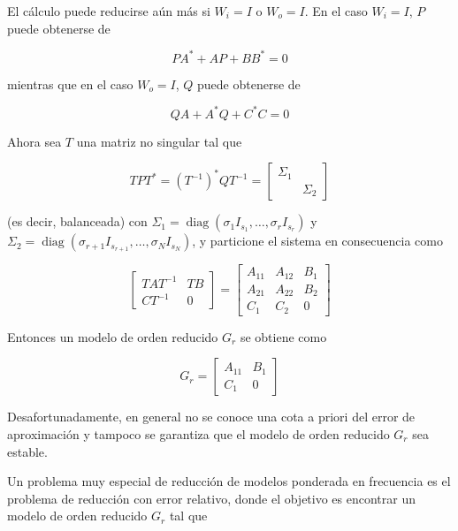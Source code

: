 El cálculo puede reducirse aún más si $W_{i}=I$ o $W_{o}=I$. En el caso $W_{i}=I$, $P$ puede obtenerse de


\begin{equation*}
P A^{*}+A P+B B^{*}=0 \tag{7.21}
\end{equation*}


mientras que en el caso $W_{o}=I$, $Q$ puede obtenerse de


\begin{equation*}
Q A+A^{*} Q+C^{*} C=0 \tag{7.22}
\end{equation*}


Ahora sea $T$ una matriz no singular tal que

$$
T P T^{*}=\left(T^{-1}\right)^{*} Q T^{-1}=\left[\begin{array}{ll}
\Sigma_{1} & \\
& \Sigma_{2}
\end{array}\right]
$$

(es decir, balanceada) con $\Sigma_{1}=\operatorname{diag}\left(\sigma_{1} I_{s_{1}}, \ldots, \sigma_{r} I_{s_{r}}\right)$ y $\Sigma_{2}=\operatorname{diag}\left(\sigma_{r+1} I_{s_{r+1}}, \ldots, \sigma_{N} I_{s_{N}}\right)$, y particione el sistema en consecuencia como

$$
\left[\begin{array}{c|c}
T A T^{-1} & T B \\
\hline C T^{-1} & 0
\end{array}\right]=\left[\begin{array}{cc|c}
A_{11} & A_{12} & B_{1} \\
A_{21} & A_{22} & B_{2} \\
\hline C_{1} & C_{2} & 0
\end{array}\right]
$$

Entonces un modelo de orden reducido $G_{r}$ se obtiene como

$$
G_{r}=\left[\begin{array}{c|c}
A_{11} & B_{1} \\
\hline C_{1} & 0
\end{array}\right]
$$

Desafortunadamente, en general no se conoce una cota a priori del error de aproximación y tampoco se garantiza que el modelo de orden reducido $G_{r}$ sea estable.

Un problema muy especial de reducción de modelos ponderada en frecuencia es el problema de reducción con error relativo, donde el objetivo es encontrar un modelo de orden reducido $G_{r}$ tal que

